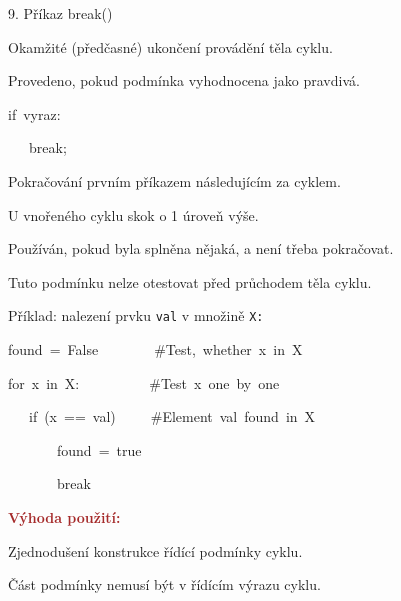 \documentclass[czech]{beamer}
\newenvironment{lyxcode}
  {\par\begin{list}{}{
    \setlength{\rightmargin}{\leftmargin}
    \setlength{\listparindent}{0pt}%
    \raggedright
    \setlength{\itemsep}{0pt}
    \setlength{\parsep}{0pt}
    \normalfont\ttfamily}%
   \def\{{\char`\{}
   \def\}{\char`\}}
   \def\textasciitilde{\char`\~}
   \item[]}
  {\end{list}}
\begin{document}
\begin{frame}[plain]{9. Příkaz break()}

{\small Okamžité (předčasné) ukončení provádění těla cyklu.}{\small\par}

{\small Provedeno, pokud podmínka vyhodnocena jako pravdivá.}{\small\par}
\begin{lyxcode}
{\small if~vyraz:}{\small\par}

{\small ~~~break;}{\small\par}
\end{lyxcode}
{\small Pokračování prvním příkazem následujícím za cyklem.}{\small\par}

{\small U vnořeného cyklu skok o 1 úroveň výše.\bigskip{}
}{\small\par}

{\small Používán, pokud byla splněna nějaká, a není třeba pokračovat.}{\small\par}

{\small Tuto podmínku nelze otestovat před průchodem těla cyklu}.

{\small\bigskip{}
}{\small\par}

{\small Příklad: nalezení prvku }{\small\texttt{val}}{\small{} v množině
}{\small\texttt{X:}}{\small\par}
\begin{lyxcode}
{\small found~=~False~~~~~~~~\#Test,~whether~x~in~X}{\small\par}

{\small for~x~in~X:~~~~~~~~~~\#Test~x~one~by~one}{\small\par}

{\small ~~~if~(x~==~val)~~~~~\#Element~val~found~in~X}{\small\par}

{\small ~~~~~~~found~=~true}{\small\par}

{\small ~~~~~~~break}{\small\par}
\end{lyxcode}
{\small\textbf{\textcolor{brown}{Výhoda použití:}}}{\small\par}

{\small Zjednodušení konstrukce řídící podmínky cyklu.}{\small\par}

{\small Část podmínky nemusí být v řídícím výrazu cyklu.}{\small\par}
\end{frame}
\end{document}
